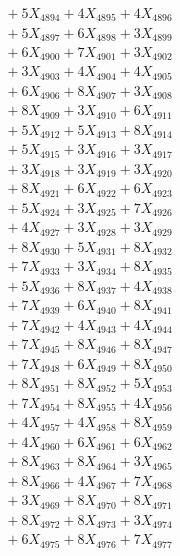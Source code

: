 \documentclass[a4paper,10pt]{article}
\begin{document}
{\begin{align}
&\;  + 5 X_{4894} + 4 X_{4895} + 4 X_{4896} \\[0.3ex]
&\;  + 5 X_{4897} + 6 X_{4898} + 3 X_{4899} \\[0.5ex]\allowbreak
&\;  + 6 X_{4900} + 7 X_{4901} + 3 X_{4902} \\[0.3ex]
&\;  + 3 X_{4903} + 4 X_{4904} + 4 X_{4905} \\[0.3ex]
&\;  + 6 X_{4906} + 8 X_{4907} + 3 X_{4908} \\[0.3ex]
&\;  + 8 X_{4909} + 3 X_{4910} + 6 X_{4911} \\[0.3ex]
&\;  + 5 X_{4912} + 5 X_{4913} + 8 X_{4914} \\[0.3ex]
&\;  + 5 X_{4915} + 3 X_{4916} + 3 X_{4917} \\[0.3ex]
&\;  + 3 X_{4918} + 3 X_{4919} + 3 X_{4920} \\[0.3ex]
&\;  + 8 X_{4921} + 6 X_{4922} + 6 X_{4923} \\[0.3ex]
&\;  + 5 X_{4924} + 3 X_{4925} + 7 X_{4926} \\[0.3ex]
&\;  + 4 X_{4927} + 3 X_{4928} + 3 X_{4929} \\[0.5ex]\allowbreak
&\;  + 8 X_{4930} + 5 X_{4931} + 8 X_{4932} \\[0.3ex]
&\;  + 7 X_{4933} + 3 X_{4934} + 8 X_{4935} \\[0.3ex]
&\;  + 5 X_{4936} + 8 X_{4937} + 4 X_{4938} \\[0.3ex]
&\;  + 7 X_{4939} + 6 X_{4940} + 8 X_{4941} \\[0.3ex]
&\;  + 7 X_{4942} + 4 X_{4943} + 4 X_{4944} \\[0.3ex]
&\;  + 7 X_{4945} + 8 X_{4946} + 8 X_{4947} \\[0.3ex]
&\;  + 7 X_{4948} + 6 X_{4949} + 8 X_{4950} \\[0.3ex]
&\;  + 8 X_{4951} + 8 X_{4952} + 5 X_{4953} \\[0.3ex]
&\;  + 7 X_{4954} + 8 X_{4955} + 4 X_{4956} \\[0.3ex]
&\;  + 4 X_{4957} + 4 X_{4958} + 8 X_{4959} \\[0.5ex]\allowbreak
&\;  + 4 X_{4960} + 6 X_{4961} + 6 X_{4962} \\[0.3ex]
&\;  + 8 X_{4963} + 8 X_{4964} + 3 X_{4965} \\[0.3ex]
&\;  + 8 X_{4966} + 4 X_{4967} + 7 X_{4968} \\[0.3ex]
&\;  + 3 X_{4969} + 8 X_{4970} + 8 X_{4971} \\[0.3ex]
&\;  + 8 X_{4972} + 8 X_{4973} + 3 X_{4974} \\[0.3ex]
&\;  + 6 X_{4975} + 8 X_{4976} + 7 X_{4977} \\[0.3ex]

\end{align}}
\end{document}
